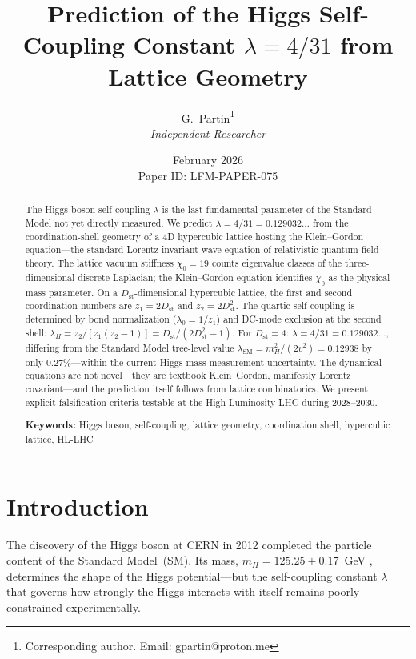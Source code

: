 \documentclass[12pt,a4paper]{article}
\title{\textbf{Prediction of the Higgs Self-Coupling Constant $\lambda = 4/31$ from Lattice Geometry}}
\author{G.~Partin\thanks{Corresponding author. Email: gpartin@proton.me}\\[6pt]
\textit{Independent Researcher}}
\date{February 2026\\[4pt] Paper ID: LFM-PAPER-075}
\newcommand{\chizero}{\chi_0}
\newcommand{\Dst}{D_{\mathrm{st}}}
\newcommand{\lambdaSM}{\lambda_{\mathrm{SM}}}
\begin{document}
\maketitle

\begin{abstract}
The Higgs boson self-coupling $\lambda$ is the last fundamental parameter of the Standard Model not yet directly measured. We predict $\lambda = 4/31 = 0.129032\ldots$ from the coordination-shell geometry of a 4D hypercubic lattice hosting the Klein--Gordon equation---the standard Lorentz-invariant wave equation of relativistic quantum field theory. The lattice vacuum stiffness $\chizero = 19$ counts eigenvalue classes of the three-dimensional discrete Laplacian; the Klein--Gordon equation identifies $\chizero$ as the physical mass parameter. On a $\Dst$-dimensional hypercubic lattice, the first and second coordination numbers are $z_1 = 2\Dst$ and $z_2 = 2\Dst^2$. The quartic self-coupling is determined by bond normalization ($\lambda_0 = 1/z_1$) and DC-mode exclusion at the second shell: $\lambda_H = z_2/[z_1(z_2-1)] = \Dst/(2\Dst^2 - 1)$. For $\Dst = 4$: $\lambda = 4/31 = 0.129032\ldots$, differing from the Standard Model tree-level value $\lambdaSM = m_H^2/(2v^2) = 0.12938$ by only 0.27\%---within the current Higgs mass measurement uncertainty. The dynamical equations are not novel---they are textbook Klein--Gordon, manifestly Lorentz covariant---and the prediction itself follows from lattice combinatorics. We present explicit falsification criteria testable at the High-Luminosity LHC during 2028--2030.

\medskip\noindent
\textbf{Keywords:} Higgs boson, self-coupling, lattice geometry, coordination shell, hypercubic lattice, HL-LHC
\end{abstract}

\section{Introduction}

The discovery of the Higgs boson at CERN in 2012 \citep{ATLAS2012,CMS2012} completed the particle content of the Standard Model~(SM). Its mass, $m_H = 125.25 \pm 0.17$~GeV \citep{PDG2024}, determines the shape of the Higgs potential---but the self-coupling constant $\lambda$ that governs how strongly the Higgs interacts with itself remains poorly constrained experimentally.
\end{document}
